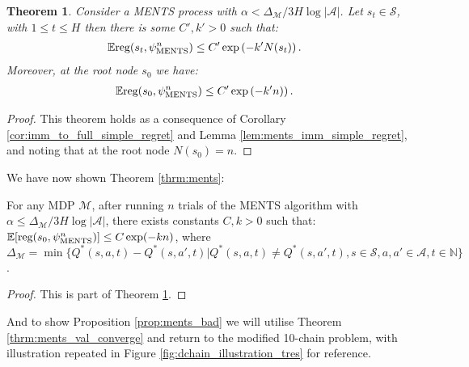 \documentclass{article}
\newcommand{\bb}[1]{\mathbb{#1}}
\newcommand{\cl}[1]{\mathcal{#1}}
\newcommand{\reg}{\textnormal{reg}}
\theoremstyle{plain}
\newtheorem{theorem}{Theorem}[section]
\begin{document}
\begin{appendices}
        \begin{theorem} \label{thrm:ments_simple_regret_converge}
            Consider a MENTS process with $\alpha<\Delta_{\cl{M}}/3H\log |\cl{A}|$. Let $s_t\in\cl{S}$, with $1\leq t \leq H$ then there is some $C',k'>0$ such that:
            \begin{align}
                \bb{E} \reg(s_{t},\psi^n_{\textnormal{MENTS}}) &\leq C'\exp\left( -k' N(s_{t}) \right).
            \end{align}
            Moreover, at the root node $s_0$ we have:
            \begin{align}
                \bb{E} \reg(s_{0},\psi^n_{\textnormal{MENTS}}) &\leq C'\exp\left( -k'n) \right).
            \end{align}
        \end{theorem}
        \begin{proof}
            This theorem holds as a consequence of Corollary \ref{cor:imm_to_full_simple_regret} and Lemma \ref{lem:ments_imm_simple_regret}, and noting that at the root node $N(s_0)=n$.
        \end{proof}











        We have now shown Theorem \ref{thrm:ments}:
        \begin{customthm}{3.2} 
            For any MDP $\cl{M}$, after running $n$ trials of the MENTS algorithm with $\alpha \leq \Delta_{\cl{M}}/3H\log|\cl{A}|$, there exists constants $C,k>0$ such that: $\bb{E}[\reg(s_0,\psi^n_{\textnormal{MENTS}})] \leq C\exp(-kn)$, where $\Delta_{\cl{M}}=\min \{Q^*(s,a,t)-Q^*(s,a',t)\vert Q^*(s,a,t) \neq Q^*(s,a',t),s\in\cl{S}, a,a'\in\cl{A},t\in\bb{N}\}$.
        \end{customthm}
        \begin{proof}
            This is part of Theorem \ref{thrm:ments_simple_regret_converge}.
        \end{proof}








    

    
        And to show Proposition \ref{prop:ments_bad} we will utilise Theorem \ref{thrm:ments_val_converge} and return to the modified 10-chain problem, with illustration repeated in Figure \ref{fig:dchain_illustration_tres} for reference.
        

\end{appendices}
\end{document}
